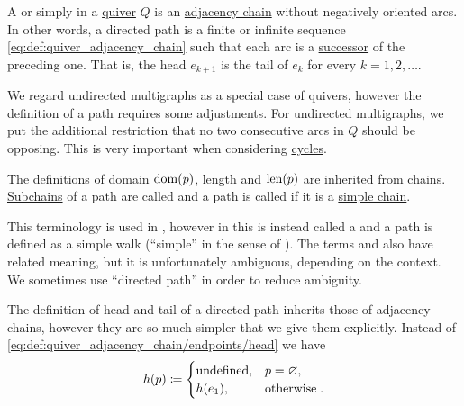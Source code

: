 \begin{definition}\label{def:quiver_directed_path}
  A  or simply  in a \hyperref[def:graph/quiver]{quiver} \( Q \) is an \hyperref[def:quiver_adjacency_chain]{adjacency chain} without negatively oriented arcs. In other words, a directed path is a finite or infinite sequence \eqref{eq:def:quiver_adjacency_chain} such that each arc is a \hyperref[def:graph/adjacency]{successor} of the preceding one. That is, the head \( e_{k+1} \) is the tail of \( e_k \) for every \( k = 1, 2, \ldots \).

  We regard undirected multigraphs as a special case of quivers, however the definition of a path requires some adjustments. For undirected multigraphs, we put the additional restriction that no two consecutive arcs in \( Q \) should be opposing. This is very important when considering \hyperref[def:quiver_cycle]{cycles}.

  The definitions of \hyperref[def:quiver_adjacency_chain/domain]{domain} \( \operatorname{dom}(p) \), \hyperref[def:quiver_adjacency_chain/length]{length} and \( \operatorname{len}(p) \) are inherited from chains. \hyperref[def:quiver_adjacency_chain/subchain]{Subchains} of a path are called  and a path is called  if it is a \hyperref[def:quiver_adjacency_chain/simple]{simple chain}.

  This terminology is used in , however in \cite[sec. 5.2]{Erickson2019} this is instead called a  and a path is defined as a simple walk (\enquote{simple} in the sense of ). The terms  and  also have related meaning, but it is unfortunately ambiguous, depending on the context. We sometimes use \enquote{directed path} in order to reduce ambiguity.

  \begin{thmenum}
     The definition of head and tail of a directed path inherits those of adjacency chains, however they are so much simpler that we give them explicitly. Instead of \eqref{eq:def:quiver_adjacency_chain/endpoints/head} we have
    \begin{equation}\label{eq:def:quiver_directed_path/endpoints/head}
      h(p) \coloneqq \begin{cases}
        \T{undefined}, &p = \varnothing, \\
        h(e_1),        &\T{otherwise}.
      \end{cases}
    \end{equation}


\end{thmenum}
\end{definition}
